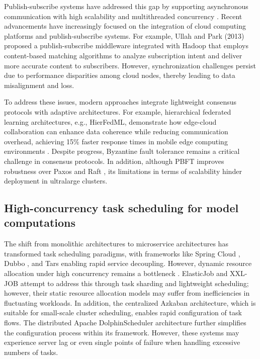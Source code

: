 \documentclass[twoside,twocolumn]{article}
\begin{document}
Publish-subscribe systems have addressed this gap by supporting asynchronous communication with high scalability and multithreaded concurrency \citep{Zhang2021,Tsenos2021}. Recent advancements have increasingly focused on the integration of cloud computing platforms and publish-subscribe systems. For example, Ullah and Park (2013) proposed a publish-subscribe middleware integrated with Hadoop that employs content-based matching algorithms to analyze subscription intent and deliver more accurate content to subscribers. However, synchronization challenges persist due to performance disparities among cloud nodes, thereby leading to data misalignment and loss.

To address these issues, modern approaches integrate lightweight consensus protocols with adaptive architectures. For example, hierarchical federated learning architectures, e.g., HierFedML, demonstrate how edge-cloud collaboration can enhance data coherence while reducing communication overhead, achieving 15\% faster response times in mobile edge computing environments \citep{Xu2023}. Despite progress, Byzantine fault tolerance remains a critical challenge in consensus protocols. In addition, although PBFT \citep{Lamport1998} improves robustness over Paxos and Raft \citep{Li2025a,Zheng2025}, its limitations in terms of scalability hinder deployment in ultralarge clusters.

\subsection{High-concurrency task scheduling for model computations}

The shift from monolithic architectures to microservice architectures has transformed task scheduling paradigms, with frameworks like Spring Cloud \citep{Larsson2021}, Dubbo \citep{Liang2017}, and Tars \citep{Mesbahi2019} enabling rapid service decoupling. However, dynamic resource allocation under high concurrency remains a bottleneck \citep{Cui2021}. ElasticJob and XXL-JOB attempt to address this through task sharding and lightweight scheduling; however, their static resource allocation models may suffer from inefficiencies in fluctuating workloads. In addition, the centralized Azkaban architecture, which is suitable for small-scale cluster scheduling, enables rapid configuration of task flows. The distributed Apache DolphinScheduler architecture \citep{Guo2019} further simplifies the configuration process within its framework. However, these systems may experience server lag or even single points of failure when handling excessive numbers of tasks.
\end{document}
